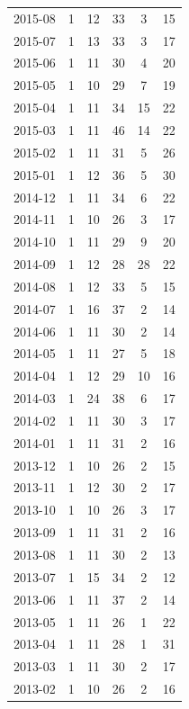 \documentclass[12pt]{report}
\begin{document}
\begin{longtable}{|c|c|c|c|c|c|}
            2015-08 & 1 & 12 & 33 & 3 & 15 \\
            2015-07 & 1 & 13 & 33 & 3 & 17 \\
            2015-06 & 1 & 11 & 30 & 4 & 20 \\
            2015-05 & 1 & 10 & 29 & 7 & 19 \\
            2015-04 & 1 & 11 & 34 & 15 & 22 \\
            2015-03 & 1 & 11 & 46 & 14 & 22 \\
            2015-02 & 1 & 11 & 31 & 5 & 26 \\
            2015-01 & 1 & 12 & 36 & 5 & 30 \\
            2014-12 & 1 & 11 & 34 & 6 & 22 \\
            2014-11 & 1 & 10 & 26 & 3 & 17 \\
            2014-10 & 1 & 11 & 29 & 9 & 20 \\
            2014-09 & 1 & 12 & 28 & 28 & 22 \\
            2014-08 & 1 & 12 & 33 & 5 & 15 \\
            2014-07 & 1 & 16 & 37 & 2 & 14 \\
            2014-06 & 1 & 11 & 30 & 2 & 14 \\
            2014-05 & 1 & 11 & 27 & 5 & 18 \\
            2014-04 & 1 & 12 & 29 & 10 & 16 \\
            2014-03 & 1 & 24 & 38 & 6 & 17 \\
            2014-02 & 1 & 11 & 30 & 3 & 17 \\
            2014-01 & 1 & 11 & 31 & 2 & 16 \\
            2013-12 & 1 & 10 & 26 & 2 & 15 \\
            2013-11 & 1 & 12 & 30 & 2 & 17 \\
            2013-10 & 1 & 10 & 26 & 3 & 17 \\
            2013-09 & 1 & 11 & 31 & 2 & 16 \\
            2013-08 & 1 & 11 & 30 & 2 & 13 \\
            2013-07 & 1 & 15 & 34 & 2 & 12 \\
            2013-06 & 1 & 11 & 37 & 2 & 14 \\
            2013-05 & 1 & 11 & 26 & 1 & 22 \\
            2013-04 & 1 & 11 & 28 & 1 & 31 \\
            2013-03 & 1 & 11 & 30 & 2 & 17 \\
            2013-02 & 1 & 10 & 26 & 2 & 16 \\

\end{longtable}
\end{document}
